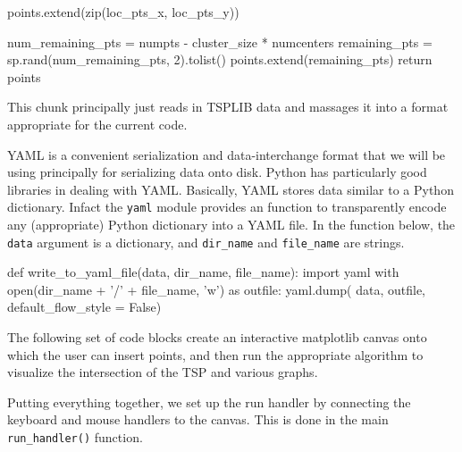         points.extend(zip(loc_pts_x, loc_pts_y))

    num_remaining_pts = numpts - cluster_size * numcenters
    remaining_pts = sp.rand(num_remaining_pts, 2).tolist()
    points.extend(remaining_pts)
    return points
\nwendcode{}\nwdocspar

This chunk principally just reads in TSPLIB data and massages it into a format appropriate for the current code. 

\nwenddocs{}\endmoddef\nwstartdeflinemarkup{}\nwenddeflinemarkup
{}\nwendcode{}\nwdocspar

YAML\cite{ben2009yaml} is a convenient serialization and data-interchange format that we will be using principally 
for serializing data onto disk. Python has particularly good libraries in dealing with YAML. Basically, 
YAML stores data similar to a Python dictionary. Infact the \texttt{yaml} module provides an function to 
transparently encode any (appropriate) Python dictionary into a YAML file. In the function below, the 
\texttt{data} argument is a dictionary, and \texttt{dir\_name} and \texttt{file\_name} are strings. 
 
\nwenddocs{}\endmoddef\nwstartdeflinemarkup{}\nwenddeflinemarkup
def write_to_yaml_file(data, dir_name, file_name):
   import yaml
   with open(dir_name + '/' + file_name, 'w') as outfile:
          yaml.dump( data, outfile, default_flow_style = False)
\nwendcode{}\nwdocspar



The following set of code blocks create an interactive matplotlib canvas onto which the user can insert points, and then 
run the appropriate algorithm to visualize the intersection of the TSP and various graphs. 

Putting everything together, we set up the run handler by connecting the keyboard and mouse handlers
to the canvas. This is done in the main \verb|run_handler()| function. 

